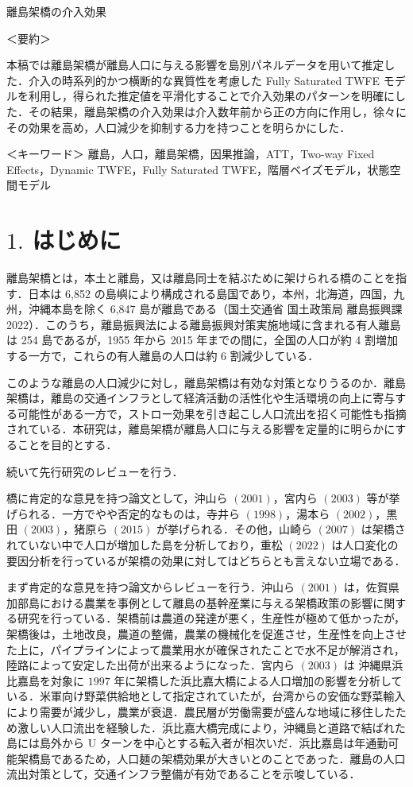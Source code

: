 

離島架橋の介入効果

＜要約＞

本稿では離島架橋が離島人口に与える影響を島別パネルデータを用いて推定した．介入の時系列的かつ横断的な異質性を考慮した
Fully Saturated TWFE
モデルを利用し，得られた推定値を平滑化することで介入効果のパターンを明確にした．その結果，離島架橋の介入効果は介入数年前から正の方向に作用し，徐々にその効果を高め，人口減少を抑制する力を持つことを明らかにした．

＜キーワード＞ 離島，人口，離島架橋，因果推論，ATT，Two-way Fixed
Effects，Dynamic TWFE，Fully Saturated
TWFE，階層ベイズモデル，状態空間モデル

\hypertarget{ux306fux3058ux3081ux306b}{%
\section{\texorpdfstring{\(1.\)
はじめに}{1. はじめに}}\label{ux306fux3058ux3081ux306b}}

離島架橋とは，本土と離島，又は離島同士を結ぶために架けられる橋のことを指す．日本は
6,852
の島嶼により構成される島国であり，本州，北海道，四国，九州，沖縄本島を除く
6,847 島が離島である（国土交通省 国土政策局 離島振興課
2022）．このうち，離島振興法による離島振興対策実施地域に含まれる有人離島は
254 島であるが，1955 年から 2015 年までの間に，全国の人口が約 4
割増加する一方で，これらの有人離島の人口は約 6 割減少している．

このような離島の人口減少に対し，離島架橋は有効な対策となりうるのか．離島架橋は，離島の交通インフラとして経済活動の活性化や生活環境の向上に寄与する可能性がある一方で，ストロー効果を引き起こし人口流出を招く可能性も指摘されている．本研究は，離島架橋が離島人口に与える影響を定量的に明らかにすることを目的とする．

続いて先行研究のレビューを行う．

橋に肯定的な意見を持つ論文として，沖山ら \((2001)\)，宮内ら \((2003)\)
等が挙げられる．一方でやや否定的なものは，寺井ら \((1998)\)，湯本ら
\((2002)\)，黒田 \((2003)\)，猪原ら \((2015)\)
が挙げられる．その他，山崎ら \((2007)\)
は架橋されていない中で人口が増加した島を分析しており，重松 \((2022)\)
は人口変化の要因分析を行っているが架橋の効果に対してはどちらとも言えない立場である．

まず肯定的な意見を持つ論文からレビューを行う．沖山ら \((2001)\)
は，佐賀県加部島における農業を事例として離島の基幹産業に与える架橋政策の影響に関する研究を行っている．架橋前は農道の発達が悪く，生産性が極めて低かったが，架橋後は，土地改良，農道の整備，農業の機械化を促進させ，生産性を向上させた上に，パイプラインによって農業用水が確保されたことで水不足が解消され，陸路によって安定した出荷が出来るようになった．宮内ら
\((2003)\) は 沖縄県浜比嘉島を対象に \(1997\)
年に架橋した浜比嘉大橋による人口増加の影響を分析している．米軍向け野菜供給地として指定されていたが，台湾からの安価な野菜輸入により需要が減少し，農業が衰退．農民層が労働需要が盛んな地域に移住したため激しい人口流出を経験した．浜比嘉大橋完成により，沖縄島と道路で結ばれた島には島外から
U
ターンを中心とする転入者が相次いだ．浜比嘉島は年通勤可能架橋島であるため，人口麺の架橋効果が大きいとのことであった．離島の人口流出対策として，交通インフラ整備が有効であることを示唆している．

